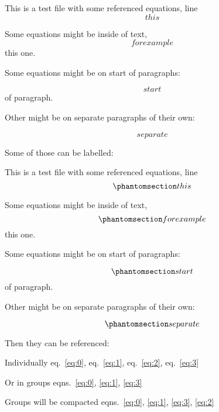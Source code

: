 This is a test file with some referenced equations, line \[ this \]

Some equations might be inside of text, \[ for example \] this one.

Some equations might be on start of paragraphs:

\[ start \] of paragraph.

Other might be on separate paragraphs of their own:

\[ separate \]

Some of those can be labelled:

This is a test file with some referenced equations, line
\begin{equation}\phantomsection\label{eq:0}{ this }\label{eq:0}\end{equation}

Some equations might be inside of text,
\begin{equation}\phantomsection\label{eq:1}{ for example }\label{eq:1}\end{equation}
this one.

Some equations might be on start of paragraphs:

\begin{equation}\phantomsection\label{eq:2}{ start }\label{eq:2}\end{equation}
of paragraph.

Other might be on separate paragraphs of their own:

\begin{equation}\phantomsection\label{eq:3}{ separate }\label{eq:3}\end{equation}

Then they can be referenced:

Individually eq.~\ref{eq:0}, eq.~\ref{eq:1}, eq.~\ref{eq:2},
eq.~\ref{eq:3}

Or in groups eqns.~\ref{eq:0}, \ref{eq:1}, \ref{eq:3}

Groups will be compacted
eqns.~\ref{eq:0}, \ref{eq:1}, \ref{eq:3}, \ref{eq:2}
